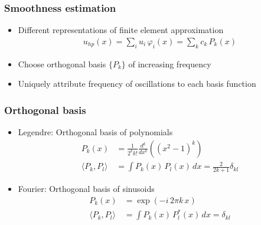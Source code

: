 \begin{frame}
\frametitle{Smoothness estimation}

\begin{itemize}
\item Different representations of finite element approximation
\begin{align*}
u_{hp}(x) = \sum\limits_i u_i \, \varphi_i(x)  = \sum\limits_k c_k \, P_k(x)
\end{align*}
\end{itemize}

\begin{itemize}
\item Choose orthogonal basis $\{P_k\}$ of increasing frequency
\item Uniquely attribute frequency of oscillations to each basis function
\end{itemize}
\end{frame}





\begin{frame}
\frametitle{Orthogonal basis}

\begin{itemize}
\item Legendre: Orthogonal basis of polynomials
  \begin{align*}
  P_k(x) &= \frac{1}{2^k k!} \frac{d^k}{dx^k} \left( (x^2 - 1)^k \right) \\
  \langle P_k, P_l \rangle &= \int P_k(x) \, P_l(x) \, dx = \frac{2}{2k+1} \delta_{kl}
  \end{align*}
\end{itemize}

\begin{itemize}
\item Fourier: Orthogonal basis of sinusoids
  \begin{align*}
  P_k(x) &= \exp \left( -i \, 2 \pi k \, x \right) \\
  \langle P_k, P_l \rangle &= \int P_k(x) \, P_l^*(x) \, dx = \delta_{kl}
  \end{align*}
\end{itemize}
\end{frame}





